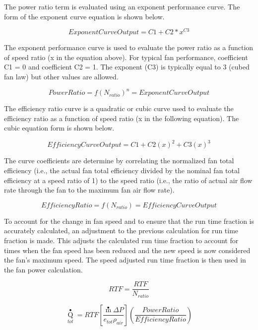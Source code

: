 The power ratio term is evaluated using an exponent performance curve. The form of the exponent curve equation is shown below.

\begin{equation}
ExponentCurveOutput = C1 + C2*{x^{C3}}
\end{equation}

The exponent performance curve is used to evaluate the power ratio as a function of speed ratio (x in the equation above). For typical fan performance, coefficient C1 = 0 and coefficient C2 = 1. The exponent (C3) is typically equal to 3 (cubed fan law) but other values are allowed.

\begin{equation}
PowerRatio = f{\left( {{N_{ratio}}} \right)^n} = ExponentCurveOutput
\end{equation}

The efficiency ratio curve is a quadratic or cubic curve used to evaluate the efficiency ratio as a function of speed ratio (x in the following equation). The cubic equation form is shown below.

\begin{equation}
EfficiencyCurveOutput = C1 + C2{\left( x \right)^2} + C3{\left( x \right)^3}
\end{equation}

The curve coefficients are determine by correlating the normalized fan total efficiency (i.e., the actual fan total efficiency divided by the nominal fan total efficiency at a speed ratio of 1) to the speed ratio (i.e., the ratio of actual air flow rate through the fan to the maximum fan air flow rate).

\begin{equation}
EfficiencyRatio = f\left( {{N_{ratio}}} \right) = EfficiencyCurveOutput
\end{equation}

To account for the change in fan speed and to ensure that the run time fraction is accurately calculated, an adjustment to the previous calculation for run time fraction is made. This adjusts the calculated run time fraction to account for times when the fan speed has been reduced and the new speed is now considered the fan's maximum speed. The speed adjusted run time fraction is then used in the fan power calculation.

\begin{equation}
RTF = \frac{RTF}{N_{ratio}}
\end{equation}

\begin{equation}
{\mathop Q\limits^ \bullet_{tot}} = RTF\left[ {\frac{{\mathop m\limits^ \bullet  \Delta P}}{{{e_{tot}}{\rho_{air}}}}} \right]\left( {\frac{{PowerRatio}}{{EfficiencyRatio}}} \right)
\end{equation}

